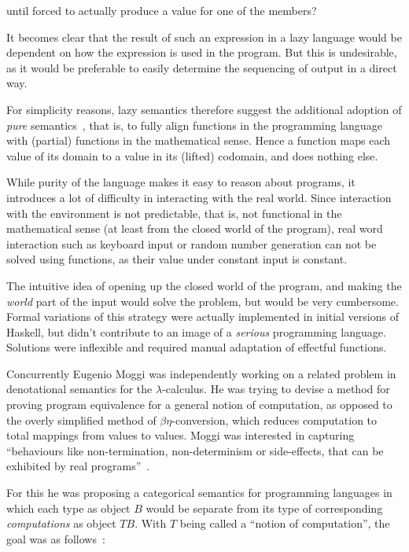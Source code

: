 until forced to actually produce a value for one of the members?

It becomes clear that the result of such an expression in a lazy
language would be dependent on how the expression is used in the
program. But this is undesirable, as it would be preferable to easily
determine the sequencing of output in a direct way.

For simplicity reasons, lazy semantics therefore suggest the additional
adoption of \emph{pure} semantics~\cite[p. 12-8]{hask-history}, that is, to
fully align functions in the programming language with (partial) functions in
the mathematical sense.  Hence a function maps each value of its domain to a
value in its (lifted) codomain, and does nothing else.

While purity of the language makes it easy to reason about programs, it
introduces a lot of difficulty in interacting with the real world. Since
interaction with the environment is not predictable, that is, not
functional in the mathematical sense (at least from the closed world of
the program), real word interaction such as keyboard input or random
number generation can not be solved using functions, as their value
under constant input is constant.

The intuitive idea of opening up the closed world of the program, and
making the \emph{world} part of the input would solve the problem, but
would be very cumbersome. Formal variations of this strategy were
actually implemented in initial versions of Haskell, but didn't
contribute to an image of a \emph{serious} programming language.
Solutions were inflexible and required manual adaptation of effectful
functions.

Concurrently Eugenio Moggi was independently working on a related problem in
denotational semantics for the $\lambda$-calculus. He was trying to devise a
method for proving program equivalence for a general notion of computation, as
opposed to the overly simplified method of $\beta\eta$-conversion, which
reduces computation to total mappings from values to values. Moggi was
interested in capturing ``behaviours like non-termination, non-determinism or
side-effects, that can be exhibited by real programs''~\cite[p.
1]{moggi-89}.

For this he was proposing a categorical semantics for programming languages in
which each type as object $B$ would be separate from its type of corresponding
\emph{computations} as object $TB$. With $T$ being called a ``notion of
computation'', the goal was as follows~\cite[p. 2]{moggi-89}:

